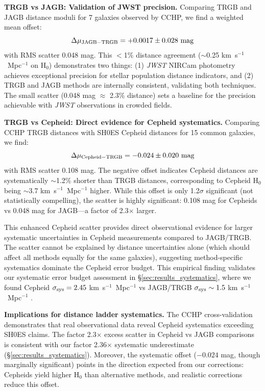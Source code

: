 \documentclass[twocolumn, linenumbers]{aastex701}
\begin{document}
\textbf{TRGB vs JAGB: Validation of JWST precision.} Comparing TRGB and JAGB distance moduli for 7 galaxies observed by CCHP, we find a weighted mean offset:
\begin{equation}
\Delta\mu_{\rm JAGB-TRGB} = +0.0017 \pm 0.028~{\rm mag}
\end{equation}
with RMS scatter 0.048 mag. This $<$1\% distance agreement ($\sim$0.25 km~s$^{-1}$~Mpc$^{-1}$ on H$_0$) demonstrates two things: (1) \textit{JWST} NIRCam photometry achieves exceptional precision for stellar population distance indicators, and (2) TRGB and JAGB methods are internally consistent, validating both techniques. The small scatter (0.048 mag $\approx$ 2.3\% distance) sets a baseline for the precision achievable with \textit{JWST} observations in crowded fields.

\textbf{TRGB vs Cepheid: Direct evidence for Cepheid systematics.} Comparing CCHP TRGB distances with SH0ES Cepheid distances for 15 common galaxies, we find:
\begin{equation}
\Delta\mu_{\rm Cepheid-TRGB} = -0.024 \pm 0.020~{\rm mag}
\end{equation}
with RMS scatter 0.108 mag. The negative offset indicates Cepheid distances are systematically $\sim$1.2\% shorter than TRGB distances, corresponding to Cepheid H$_0$ being $\sim$3.7 km~s$^{-1}$~Mpc$^{-1}$ higher. While this offset is only 1.2$\sigma$ significant (not statistically compelling), the scatter is highly significant: 0.108 mag for Cepheids vs 0.048 mag for JAGB---a factor of 2.3$\times$ larger.

This enhanced Cepheid scatter provides direct observational evidence for larger systematic uncertainties in Cepheid measurements compared to JAGB/TRGB. The scatter cannot be explained by distance uncertainties alone (which should affect all methods equally for the same galaxies), suggesting method-specific systematics dominate the Cepheid error budget. This empirical finding validates our systematic error budget assessment in \S\ref{sec:results_systematics}, where we found Cepheid $\sigma_{\rm sys} = 2.45$ km~s$^{-1}$~Mpc$^{-1}$ vs JAGB/TRGB $\sigma_{\rm sys} \sim 1.5$ km~s$^{-1}$~Mpc$^{-1}$ \citep{Freedman2024}.

\textbf{Implications for distance ladder systematics.} The CCHP cross-validation demonstrates that real observational data reveal Cepheid systematics exceeding SH0ES claims. The factor 2.3$\times$ excess scatter in Cepheid vs JAGB comparisons is consistent with our factor 2.36$\times$ systematic underestimate (\S\ref{sec:results_systematics}). Moreover, the systematic offset ($-0.024$ mag, though marginally significant) points in the direction expected from our corrections: Cepheids yield higher H$_0$ than alternative methods, and realistic corrections reduce this offset.
\end{document}

